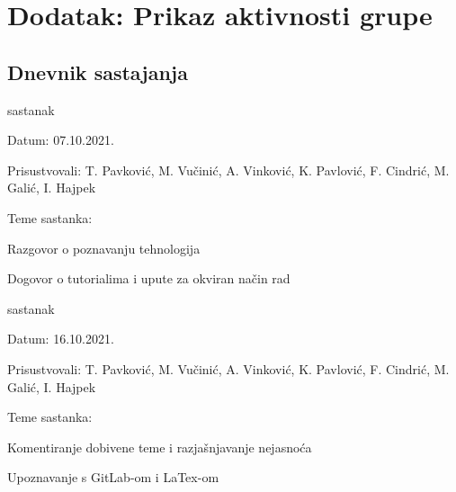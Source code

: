 \chapter*{Dodatak: Prikaz aktivnosti grupe}
		
		\section*{Dnevnik sastajanja}
		
		
		\begin{packed_enum}
			\item  sastanak
			
			\item[] \begin{packed_item}
				\item Datum: 07.10.2021.
				\item Prisustvovali: T. Pavković, M. Vučinić, A. Vinković, K. Pavlović, F. Cindrić, M. Galić, I. Hajpek
				\item Teme sastanka:
				\begin{packed_item}
					\item  Razgovor o poznavanju tehnologija
					\item  Dogovor o tutorialima i upute za okviran način rad
				\end{packed_item}
			\end{packed_item}
			
			\item  sastanak
			\item[] \begin{packed_item}
				\item Datum: 16.10.2021.
				\item Prisustvovali: T. Pavković, M. Vučinić, A. Vinković, K. Pavlović, F. Cindrić, M. Galić, I. Hajpek
				\item Teme sastanka:
				\begin{packed_item}
					\item  Komentiranje dobivene teme i razjašnjavanje nejasnoća
					\item  Upoznavanje s GitLab-om i LaTex-om
				\end{packed_item}
			\end{packed_item}


\end{packed_enum}

